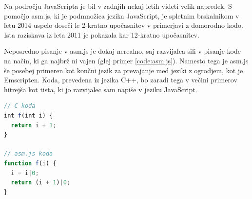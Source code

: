 Na področju JavaScripta je bil v zadnjih nekaj letih videti velik napredek. S pomočjo asm.js\cite{asmjs}, ki je podmnožica jezika JavaScript, je spletnim brskalnikom v letu 2014 uspelo doseči le 2-kratno upočasnitev v primerjavi z domorodno kodo. Ista raziskava iz leta 2011 je pokazala kar 12-kratno upočasnitev\cite{html5-gamedev}.

Neposredno pisanje v asm.js je dokaj nerealno, saj razvijalca sili v pisanje kode na način, ki ga najbrž ni vajen (glej primer \ref{code:asm.js}). Namesto tega je asm.js še posebej primeren kot končni jezik za prevajanje med jeziki z ogrodjem, kot je Emscripten. Koda, prevedena iz jezika C++, bo zaradi tega v večini primerov hitrejša kot tista, ki jo razvijalec sam napiše v jeziku JavaScript.

\begin{lstlisting}[caption={Primer prevoda C kode v asm.js kodo.}, label=code:asm.js, language=JavaScript]
// C koda
int f(int i) {
  return i + 1;
}

// asm.js koda
function f(i) {
  i = i|0;
  return (i + 1)|0;
}
\end{lstlisting}


